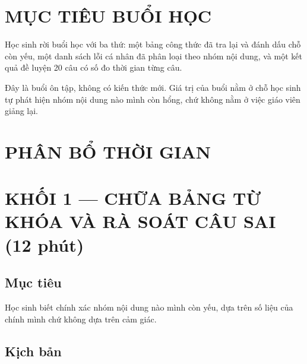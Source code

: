\documentclass[11pt, a4paper]{article}
\begin{document}

\section{MỤC TIÊU BUỔI HỌC}

Học sinh rời buổi học với ba thứ: một bảng công thức đã tra lại và đánh dấu chỗ còn yếu, một danh sách lỗi cá nhân đã phân loại theo nhóm nội dung, và một kết quả đề luyện 20 câu có số đo thời gian từng câu.

Đây là buổi ôn tập, không có kiến thức mới. Giá trị của buổi nằm ở chỗ học sinh tự phát hiện nhóm nội dung nào mình còn hổng, chứ không nằm ở việc giáo viên giảng lại.

\section{PHÂN BỔ THỜI GIAN}


\section{KHỐI 1 — CHỮA BẢNG TỪ KHÓA VÀ RÀ SOÁT CÂU SAI (12 phút)}

\subsection{Mục tiêu}

Học sinh biết chính xác nhóm nội dung nào mình còn yếu, dựa trên số liệu của chính mình chứ không dựa trên cảm giác.

\subsection{Kịch bản}
\end{document}
